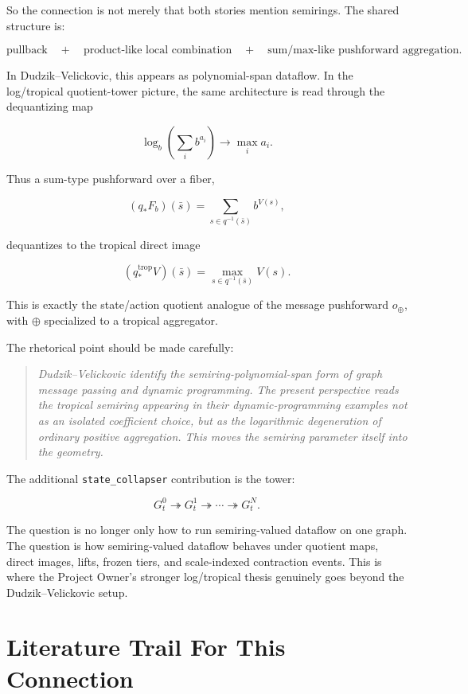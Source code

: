 \documentclass[11pt]{article}
\newcommand{\SC}{\texttt{state\_collapser}}
\newenvironment{claimbox}
  {\begin{quote}\itshape}
  {\end{quote}}
\begin{document}
So the connection is not merely that both stories mention semirings. The shared
structure is:

\[
\text{pullback}
\quad+\quad
\text{product-like local combination}
\quad+\quad
\text{sum/max-like pushforward aggregation}.
\]

In Dudzik--Velickovic, this appears as polynomial-span dataflow. In the
log/tropical quotient-tower picture, the same architecture is read through the
dequantizing map

\[
\log_b
\left(
\sum_i b^{a_i}
\right)
\longrightarrow
\max_i a_i.
\]

Thus a sum-type pushforward over a fiber,

\[
(q_*F_b)(\bar s)
=
\sum_{s\in q^{-1}(\bar s)} b^{V(s)},
\]

dequantizes to the tropical direct image

\[
(q_*^{\mathrm{trop}}V)(\bar s)
=
\max_{s\in q^{-1}(\bar s)}V(s).
\]

This is exactly the state/action quotient analogue of the message pushforward
\(o_\oplus\), with \(\oplus\) specialized to a tropical aggregator.

The rhetorical point should be made carefully:

\begin{claimbox}
Dudzik--Velickovic identify the semiring-polynomial-span form of graph message
passing and dynamic programming. The present perspective reads the tropical
semiring appearing in their dynamic-programming examples not as an isolated
coefficient choice, but as the logarithmic degeneration of ordinary positive
aggregation. This moves the semiring parameter itself into the geometry.
\end{claimbox}

The additional \SC{} contribution is the tower:

\[
G_t^0
\twoheadrightarrow
G_t^1
\twoheadrightarrow
\cdots
\twoheadrightarrow
G_t^N.
\]

The question is no longer only how to run semiring-valued dataflow on one
graph. The question is how semiring-valued dataflow behaves under quotient
maps, direct images, lifts, frozen tiers, and scale-indexed contraction events.
This is where the Project Owner's stronger log/tropical thesis genuinely goes
beyond the Dudzik--Velickovic setup.

\section{Literature Trail For This Connection}
\end{document}
